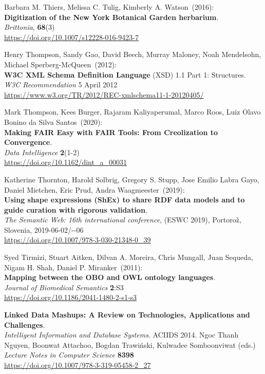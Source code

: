 \begin{thebibliography}{9}
Barbara M. Thiers, Melissa C. Tulig, Kimberly A. Watson~(2016): \\
\textbf{Digitization of the New York Botanical Garden herbarium}.\\
\emph{Brittonia}, \textbf{68}(3)\\
\url{https://doi.org/10.1007/s12228-016-9423-7}

Henry Thompson, Sandy Gao, David Beech, Murray Maloney, Noah Mendelsohn, Michael Sperberg-McQueen~(2012): \\
\textbf{W3C XML Schema Definition Language} ({XSD}) 1.1 {Part} 1: {Structures}. \\
\emph{W3C Recommendation} 5 April 2012 \\
\url{https://www.w3.org/TR/2012/REC-xmlschema11-1-20120405/}

Mark Thompson, Kees Burger, Rajaram Kaliyaperumal, Marco Roos, Luiz Olavo Bonino da Silva Santos~(2020): \\
\textbf{Making FAIR Easy with FAIR Tools: From Creolization to Convergence}.\\
\emph{Data Intelligence} \textbf{2}(1-2)\\
\url{https://doi.org/10.1162/dint_a_00031}

Katherine Thornton, Harold Solbrig, Gregory S. Stupp, Jose Emilio Labra Gayo, Daniel Mietchen, Eric Prud, Andra Waagmeester~(2019): \\
\textbf{Using shape expressions ({ShEx}) to share {RDF} data models and
to guide curation with rigorous validation}. \\
\emph{The Semantic Web: 16th international conference}, (ESWC 2019), Portorož, Slovenia,
2019-06-02/-{}-06\\
\url{https://doi.org/10.1007/978-3-030-21348-0_39}

Syed Tirmizi, Stuart Aitken, Dilvan A. Moreira, Chris Mungall, Juan Sequeda, Nigam H. Shah, Daniel P. Miranker~(2011): \\
\textbf{Mapping between the {OBO} and {OWL} ontology languages}. \\
\emph{Journal of Biomedical Semantics} \textbf{2}:S3 \\
\url{https://doi.org/10.1186/2041-1480-2-s1-s3}

\textbf{Linked Data Mashups: A Review on Technologies, Applications and Challenges}. \\
\emph{Intelligent Information and Database Systems}. ACIIDS 2014. Ngoc Thanh Nguyen, Boonwat Attachoo, Bogdan Trawiński, Kulwadee Somboonviwat (eds.)\\
\emph{Lecture Notes in Computer Science} \textbf{8398}\\
\url{https://doi.org/10.1007/978-3-319-05458-2_27}


\end{thebibliography}
